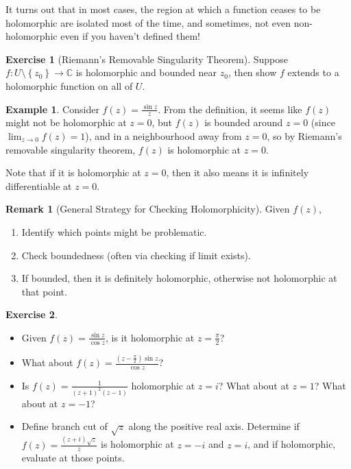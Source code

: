 \documentclass[a4paper, 12pt]{article}
\theoremstyle{definition}
\newtheorem{exercise}{Exercise}
\newtheorem{example}{Example}
\newtheorem{remark}{Remark}
\numberwithin{theorem}{section}
\numberwithin{definition}{section}
\numberwithin{exercise}{section}
\numberwithin{remark}{section}
\numberwithin{figure}{section}
\numberwithin{example}{section}
\newcommand{\C}{\mathbb{C}}
\begin{document}
It turns out that in most cases, the region at which a function ceases to be holomorphic
are isolated most of the time, and sometimes, not even non-holomorphic even if you haven't defined them!
\begin{exercise}[Riemann's Removable Singularity Theorem]
    Suppose $f:U \setminus \left\{ z_0 \right\} \rightarrow \C$ is holomorphic and bounded near $z_0$,
    then show $f$ extends to a holomorphic function on all of $U$.
\end{exercise}
\begin{example}
    Consider $f(z) = \frac{\sin{z}}{z}$.
    From the definition, it seems like $f(z)$ might not be holomorphic at $z=0$,
    but $f(z)$ is bounded around $z=0$ (since $\lim_{z\rightarrow 0} f(z) = 1$),
    and in a neighbourhood away from $z=0$,
    so by Riemann's removable singularity theorem,
    $f(z)$ is holomorphic at $z=0$.

    Note that if it is holomorphic at $z=0$, then it also means it is infinitely differentiable at $z=0$.
\end{example}
\begin{remark}[General Strategy for Checking Holomorphicity]
    Given $f(z)$,
    \begin{enumerate}
        \item Identify which points might be problematic.
        \item Check boundedness (often via checking if limit exists).
        \item If bounded, then it is definitely holomorphic, otherwise not holomorphic at that point.
    \end{enumerate}
\end{remark}
\begin{exercise}
    \begin{itemize}
        \item Given $f(z) = \frac{\sin{z}}{\cos{z}}$, is it holomorphic at $z=\frac{\pi}{2}$?
        \item What about $f(z) = \frac{\left( z-\frac{\pi}{2} \right)\sin{z}}{\cos{z}}$?
        \item Is $f(z) = \frac{1}{(z+1)^2 (z-1)}$ holomorphic at $z=i$? What about at $z=1$? What about at $z=-1$?
        \item Define branch cut of $\sqrt{z}$ along the positive real axis.
            Determine if $f(z) = \frac{\left( z+i \right) \sqrt{z}}{z}$ is holomorphic at $z=-i$ and $z=i$, and if holomorphic, evaluate at those points.
    \end{itemize}
\end{exercise}
\end{document}
